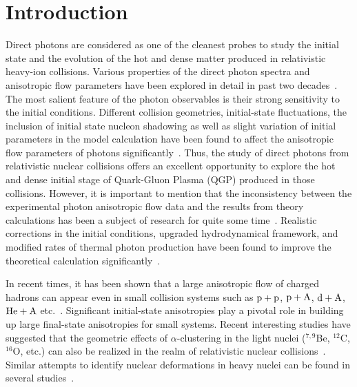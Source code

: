 \documentclass[aps,prc,twocolumn,floatfix,12pts,superscriptaddress]{revtex4}
\begin{document}
\maketitle

\section{Introduction}
Direct photons are considered as one of the cleanest probes to study the initial state and the evolution of the hot and dense matter produced in relativistic heavy-ion collisions. Various properties of the direct photon spectra and anisotropic flow parameters have been explored in detail in past two decades~\cite{Srivastava:2008es, Chatterjee:2005de, Gale:2014dfa, Chatterjee:2013naa, Monnai:2014kqa, McLerran:2014hza, Basar:2012bp, Tuchin:2012mf, Zakharov:2016mmc, Chatterjee:2021gwa}. The most salient feature of the photon observables is their strong sensitivity to the initial conditions. Different collision geometries, initial-state fluctuations, the inclusion of initial state nucleon shadowing as well as slight variation of initial parameters in the model calculation have been found to affect the anisotropic flow parameters of photons significantly~\cite{Dasgupta:2020orj, Dasgupta:2016qkq, Vujanovic:2014xva, Liu:2012ax, Chatterjee:2008tp, Chatterjee:2009qz, Chatterjee:2012dn}. Thus, the study of direct photons from relativistic nuclear collisions offers an excellent opportunity to explore the hot and dense initial stage of Quark-Gluon Plasma (QGP) produced in those collisions. However, it is important to mention that the inconsistency between the experimental photon anisotropic flow data and the results from theory calculations has been a subject of research for quite some time~\cite{Adare:2015lcd,Acharya:2018bdy}. Realistic corrections in the initial conditions, upgraded hydrodynamical framework, and modified rates of thermal photon production have been found to improve the theoretical calculation significantly~\cite{David:2019wpt, Shen:2015nto, Gale:2020xlg, Dasgupta:2017fns, Iatrakis:2016ugz}. 


In recent times, it has been shown that a large anisotropic flow of charged hadrons can appear even in small collision systems such as ${\rm p + p}$, ${\rm p + A}$, ${\rm d + A}$, ${\rm He + A}$ etc.~\cite{PHENIX:2018lia, ATLAS:2015hzw, CMS:2012qk}. Significant initial-state anisotropies play a pivotal role in building up large final-state anisotropies for small systems. Recent interesting studies have suggested that the geometric effects of $\alpha$-clustering in the light nuclei ({$^{7,9}$Be}, $^{12}$C, $^{16}$O, etc.) can also be realized in the realm of relativistic nuclear collisions~\cite{Rybczynski:2017nrx,Bozek:2014cva,Li:2020vrg,Zhang:2017xda,He:2021uko}. { Similar attempts to identify nuclear deformations in heavy nuclei can be found in several studies~\cite{Giacalone:2021udy,Jia:2021tzt,Jia:2021qyu,Xu:2021vpn,Zhao:2022grq,Bally:2022vgo}.}
\end{document}
